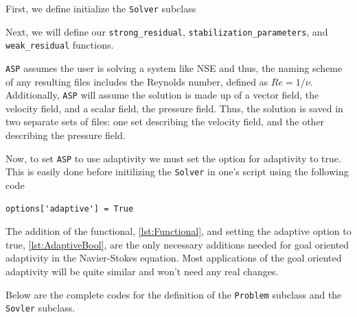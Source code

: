     First, we define initialize the \texttt{Solver} subclass
    

    Next, we will define our \texttt{strong\_residual},
    \texttt{stabilization\_parameters}, and \texttt{weak\_residual} functions.
    

    \begin{remark}
        \texttt{ASP} assumes the user is solving a system like NSE and thus,
        the naming scheme of any resulting files includes the Reynolds number,
        defined as $Re=1/\nu$. Additionally, \texttt{ASP} will assume the
        solution is made up of a vector field, the velocity field, and a
        scalar field, the pressure field. Thus, the solution is saved in two
        separate sets of files: one set describing the velocity field, and the
        other describing the pressure field.
    \end{remark}

    Now, to set \texttt{ASP} to use adaptivity we must set the option for
    adaptivity to true. This is easily done before initilizing the
    \texttt{Solver} in one's script using the following code
    \begin{lstlisting}[label={lst:AdaptiveBool},
                       caption={Setting the the adaptive boolean to true.}]
        options['adaptive'] = True
    \end{lstlisting}

    The addition of the functional, \autoref{lst:Functional}, and setting the
    adaptive option to true, \autoref{lst:AdaptiveBool}, are the only necessary
    additions needed for goal oriented adaptivity in the Navier-Stokes equation.
    Most applications of the goal oriented adaptivity will be quite similar and
    won't need any real changes.

    Below are the complete codes for the definition of the \texttt{Problem}
    subclass and the \texttt{Sovler} subclass.
    

    

